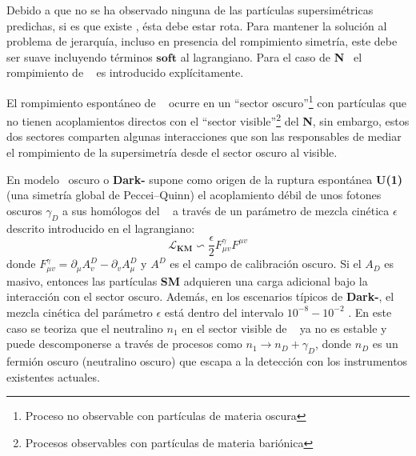 Debido a que no se ha observado ninguna de las partículas supersimétricas predichas, si es que existe \SUSY, ésta debe estar rota. Para mantener la solución al problema de jerarquía, incluso en presencia del rompimiento simetría, este debe ser suave incluyendo términos $\mathbf{soft}$ al lagrangiano. Para el caso de \textbf{N}\MSSM ~ el rompimiento de \SUSY ~ es introducido explícitamente. %

El rompimiento espontáneo de \SUSY ~ ocurre en un ``sector oscuro''\footnote{Proceso no observable con partículas de materia oscura} con partículas que no tienen acoplamientos directos con el %
``sector visible''\footnote{Procesos observables con partículas de materia bariónica} del \textbf{N}\MSSM, sin embargo, estos dos sectores comparten algunas interacciones que son las responsables de mediar el rompimiento de la supersimetría desde el sector oscuro al visible.

En modelo \SUSY ~oscuro o \textbf{Dark-\SUSY} supone como origen de la ruptura espontánea \textbf{U(1)} (una simetría global de Peccei–Quinn) el acoplamiento débil de unos fotones oscuros $\gamma_D$ a sus homólogos del \ME ~ a través de un parámetro de mezcla cinética $\epsilon$ descrito introducido en el lagrangiano:
\begin{equation}
\mathcal{L}_\mathbf{KM}\backsim \dfrac{\epsilon}{2} F_{\mu v}^{\gamma} F^{\mu v}
\end{equation}
donde $F_{\mu v}^{\gamma} = \partial_\mu A_v^{D} -\partial_v A_\mu^D$ y $A^D$ es el campo de calibración oscuro. Si el $A_D$ es masivo, entonces las partículas \textbf{SM} adquieren una carga adicional bajo la interacción con el sector oscuro. Además, en los escenarios típicos de \textbf{Dark-\SUSY}, el mezcla cinética del parámetro $\epsilon$ está dentro del intervalo $10^{-8}-10^{-2}$ \citep{cms_collaboration_search_2019-1}. En este caso se teoriza que el neutralino $n_1$ en el sector visible de \SUSY ~ ya no es estable y puede descomponerse a través de procesos como $n_1\longrightarrow  n_D + \gamma_D$, donde $n_D$ es un fermión oscuro (neutralino oscuro) que escapa a la detección con los instrumentos existentes actuales. 

